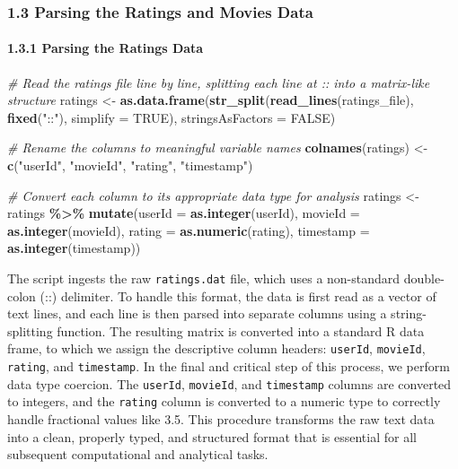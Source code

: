 \documentclass[
]{article}
\newenvironment{Shaded}{\begin{snugshade}}{\end{snugshade}}
\newcommand{\AttributeTok}[1]{\textcolor[rgb]{0.13,0.29,0.53}{#1}}
\newcommand{\CommentTok}[1]{\textcolor[rgb]{0.56,0.35,0.01}{\textit{#1}}}
\newcommand{\ConstantTok}[1]{\textcolor[rgb]{0.56,0.35,0.01}{#1}}
\newcommand{\FunctionTok}[1]{\textcolor[rgb]{0.13,0.29,0.53}{\textbf{#1}}}
\newcommand{\NormalTok}[1]{#1}
\newcommand{\OtherTok}[1]{\textcolor[rgb]{0.56,0.35,0.01}{#1}}
\newcommand{\SpecialCharTok}[1]{\textcolor[rgb]{0.81,0.36,0.00}{\textbf{#1}}}
\newcommand{\StringTok}[1]{\textcolor[rgb]{0.31,0.60,0.02}{#1}}
\begin{document}
\subsubsection{1.3 Parsing the Ratings and Movies
Data}\label{parsing-the-ratings-and-movies-data}

\paragraph{1.3.1 Parsing the Ratings
Data}\label{parsing-the-ratings-data}

\begin{Shaded}
\begin{Highlighting}[]
\CommentTok{\# Read the ratings file line by line, splitting each line at \textquotesingle{}::\textquotesingle{} into a matrix{-}like structure}
\NormalTok{ratings }\OtherTok{\textless{}{-}} \FunctionTok{as.data.frame}\NormalTok{(}\FunctionTok{str\_split}\NormalTok{(}\FunctionTok{read\_lines}\NormalTok{(ratings\_file), }
                                   \FunctionTok{fixed}\NormalTok{(}\StringTok{"::"}\NormalTok{), }\AttributeTok{simplify =} \ConstantTok{TRUE}\NormalTok{), }
                         \AttributeTok{stringsAsFactors =} \ConstantTok{FALSE}\NormalTok{)}

\CommentTok{\# Rename the columns to meaningful variable names}
\FunctionTok{colnames}\NormalTok{(ratings) }\OtherTok{\textless{}{-}} \FunctionTok{c}\NormalTok{(}\StringTok{"userId"}\NormalTok{, }\StringTok{"movieId"}\NormalTok{, }\StringTok{"rating"}\NormalTok{, }\StringTok{"timestamp"}\NormalTok{)}

\CommentTok{\# Convert each column to its appropriate data type for analysis}
\NormalTok{ratings }\OtherTok{\textless{}{-}}\NormalTok{ ratings }\SpecialCharTok{\%\textgreater{}\%} 
  \FunctionTok{mutate}\NormalTok{(}\AttributeTok{userId =} \FunctionTok{as.integer}\NormalTok{(userId), }
         \AttributeTok{movieId =} \FunctionTok{as.integer}\NormalTok{(movieId), }
         \AttributeTok{rating =} \FunctionTok{as.numeric}\NormalTok{(rating), }
         \AttributeTok{timestamp =} \FunctionTok{as.integer}\NormalTok{(timestamp))}
\end{Highlighting}
\end{Shaded}

The script ingests the raw \texttt{ratings.dat} file, which uses a
non-standard double-colon (::) delimiter. To handle this format, the
data is first read as a vector of text lines, and each line is then
parsed into separate columns using a string-splitting function. The
resulting matrix is converted into a standard R data frame, to which we
assign the descriptive column headers: \texttt{userId},
\texttt{movieId}, \texttt{rating}, and \texttt{timestamp}. In the final
and critical step of this process, we perform data type coercion. The
\texttt{userId}, \texttt{movieId}, and \texttt{timestamp} columns are
converted to integers, and the \texttt{rating} column is converted to a
numeric type to correctly handle fractional values like 3.5. This
procedure transforms the raw text data into a clean, properly typed, and
structured format that is essential for all subsequent computational and
analytical tasks.
\end{document}
